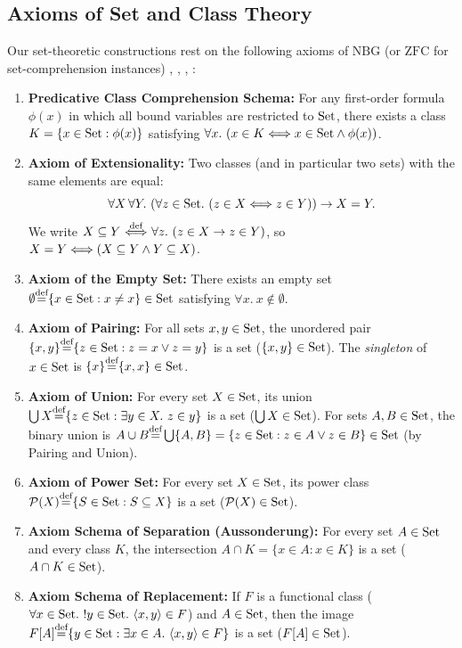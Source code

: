 \documentclass[10pt,a4paper]{article}
\begin{document}
\subsection{Axioms of Set and Class Theory}\label{sec:axioms}
Our set-theoretic constructions rest on the following axioms of $\mathrm{NBG}$ (or $\mathrm{ZFC}$ for set-comprehension instances) \cite[Ch.~I]{Godel1940}, \cite[Ch.~I--II]{Bernays1958}, \cite[Ch.~2--3]{TakeutiZaring1982}, \cite[Ch.~4]{Mendelson2015}:
\begin{enumerate}
\item \textbf{Predicative Class Comprehension Schema:} For any first-order formula $\phi(x)$ in which all bound variables are restricted to ${\textrm{Set}}$, there exists a class $K = \{x \in {\textrm{Set}} : \phi(x)\}$ satisfying $\forall x.\ (x \in K \Longleftrightarrow x \in {\textrm{Set}} \land \phi(x))$.
\item \textbf{Axiom of Extensionality:} Two classes (and in particular two sets) with the same elements are equal:
$$\forall X\, \forall Y.\ (\forall z \in {\textrm{Set}}.\ (z \in X \Longleftrightarrow z \in Y)) \to X = Y.$$
We write $X \subseteq Y {\stackrel{{\textrm{def}}}{\ \Longleftrightarrow\ }} \forall z.\ (z \in X \to z \in Y)$, so $X = Y \Longleftrightarrow (X \subseteq Y \land Y \subseteq X)$.
\item \textbf{Axiom of the Empty Set:} There exists an empty set $\emptyset {\stackrel{{\textrm{def}}}{=}} \{x \in {\textrm{Set}} : x \neq x\} \in {\textrm{Set}}$ satisfying $\forall x.\ x \notin \emptyset$.
\item \textbf{Axiom of Pairing:} For all sets $x, y \in {\textrm{Set}}$, the unordered pair $\{x, y\} {\stackrel{{\textrm{def}}}{=}} \{z \in {\textrm{Set}} : z = x \lor z = y\}$ is a set ($\{x, y\} \in {\textrm{Set}}$). The \emph{singleton} of $x \in {\textrm{Set}}$ is $\{x\} {\stackrel{{\textrm{def}}}{=}} \{x, x\} \in {\textrm{Set}}$.
\item \textbf{Axiom of Union:} For every set $X \in {\textrm{Set}}$, its union $\bigcup X {\stackrel{{\textrm{def}}}{=}} \{z \in {\textrm{Set}} : \exists y \in X.\ z \in y\}$ is a set ($\bigcup X \in {\textrm{Set}}$). For sets $A, B \in {\textrm{Set}}$, the binary union is $A \cup B {\stackrel{{\textrm{def}}}{=}} \bigcup \{A, B\} = \{z \in {\textrm{Set}} : z \in A \lor z \in B\} \in {\textrm{Set}}$ (by Pairing and Union).
\item \textbf{Axiom of Power Set:} For every set $X \in {\textrm{Set}}$, its power class ${\mathcal{P}}(X) {\stackrel{{\textrm{def}}}{=}} \{S \in {\textrm{Set}} : S \subseteq X\}$ is a set (${\mathcal{P}}(X) \in {\textrm{Set}}$).
\item \textbf{Axiom Schema of Separation (Aussonderung):} For every set $A \in {\textrm{Set}}$ and every class $K$, the intersection $A \cap K = \{x \in A : x \in K\}$ is a set ($A \cap K \in {\textrm{Set}}$).
\item \textbf{Axiom Schema of Replacement:} If $F$ is a functional class ($\forall x \in \Set.\ !y \in \Set.\ \langle x, y \rangle \in F$) and $A \in {\textrm{Set}}$, then the image $F[A] \eqdef \{y \in \Set : \exists x \in A.\ \langle x, y \rangle \in F\}$ is a set ($F[A] \in {\textrm{Set}}$).

\end{enumerate}
\end{document}
